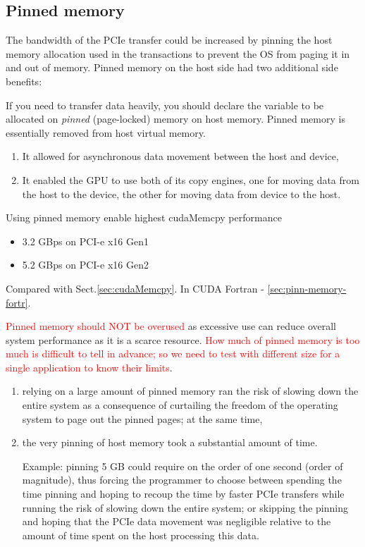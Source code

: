 \subsection{Pinned memory}
\label{sec:pinned-memory}

The bandwidth of the PCIe transfer could be increased by pinning the host memory
allocation used in the transactions to prevent the OS from paging it in and out
of memory. Pinned memory on the host side had two additional side benefits:

If you need to transfer data heavily, you should declare the variable
to be allocated on {\it pinned} (page-locked) memory on host
memory. Pinned memory is essentially removed from host virtual
memory. 
\begin{enumerate}
  \item It allowed for asynchronous data movement between the host and device,
  
  \item It enabled the GPU to use both of its copy engines, one for moving data
  from the host to the device, the other for moving data from device to the
  host.
  
\end{enumerate}

Using pinned memory enable highest cudaMemcpy performance
\begin{itemize}
\item 3.2 GBps on PCI-e x16 Gen1
\item 5.2 GBps on PCI-e x16 Gen2
\end{itemize}
Compared with Sect.\ref{sec:cudaMemcpy}. In CUDA Fortran - \ref{sec:pinn-memory-fortr}.

\textcolor{red}{Pinned memory should NOT be overused} as excessive use
can reduce overall system performance as it is a scarce resource.
\textcolor{red}{How much of pinned memory is too much is difficult to
  tell in advance; so we need to test with different size for a single
  application to know their limits}.
\begin{enumerate}
  
  \item  relying on a large amount of pinned memory ran the risk of slowing down
  the entire system as a consequence of curtailing the freedom of the operating
  system to page out the pinned pages; at the same time, 
  
  \item the very pinning of host memory took a substantial amount of time.
  
 Example: pinning 5 GB could require on the order of one second (order of
 magnitude), thus forcing the programmer to choose between spending the time
 pinning and hoping to recoup the time by faster PCIe transfers while running
 the risk of slowing down the entire system; or skipping the pinning and hoping
 that the PCIe data movement was negligible relative to the amount of time spent
 on the host processing this data.
  
\end{enumerate}

